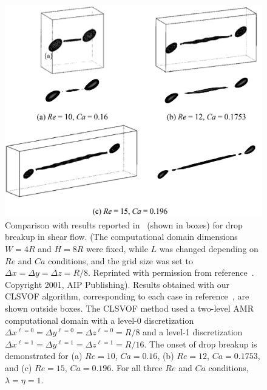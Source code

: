 \documentclass[%
 reprint,
 showkeys,
 amsmath,amssymb,
 aps,
 prfluids,
 onecolumn
]{revtex4-2}
\begin{document}
%
\begin{figure}[h!]
  \centering
  \includegraphics[width=\textwidth]{DropBreakComparison}
  \caption{Comparison with results reported in~\cite{RenCri01-2} (shown in boxes) 
           for drop breakup in shear flow.  (The computational domain
           dimensions $W=4R$ and $H=8R$ were fixed, while $L$ was changed depending 
           on $Re$ and $Ca$ conditions, and the grid size was set to 
           $\Delta x=\Delta y=\Delta z=R/8$.  Reprinted with permission from 
           reference~\cite{RenCri01-2}. Copyright 2001, AIP Publishing). Results
           obtained with our CLSVOF algorithm, corresponding to each case in
           reference~\cite{RenCri01-2}, are shown outside boxes.  The
           CLSVOF method used a two-level AMR computational domain 
           with a level-0 discretization $\Delta x^{\ell=0} = \Delta y^{\ell=0} 
           = \Delta z^{\ell=0} = R/8$ and a level-1 discretization
           $\Delta x^{\ell=1} = \Delta y^{\ell=1} = \Delta z^{\ell=1} = R/16$. 
           The onset of drop breakup is demonstrated for (a) $Re=10$,
           $Ca=0.16$, (b) $Re=12$, $Ca=0.1753$, and (c) $Re=15$, $Ca=0.196$.
           For all three $Re$ and $Ca$ conditions, $\lambda = \eta = 1$.}
  \label{fig:DropBreakComp}
\end{figure}
%
\end{document}
